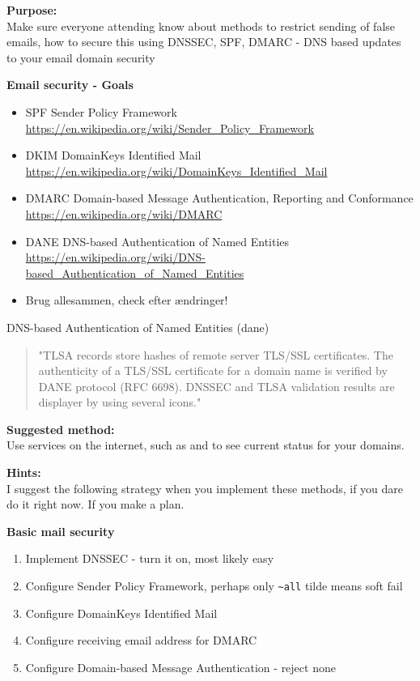 \documentclass[a4paper,11pt,notitlepage]{report}
\begin{document}
{\bf Purpose:}\\
Make sure everyone attending know about methods to restrict sending of false emails, how to secure this using DNSSEC, SPF, DMARC - DNS based updates to your email domain security


{\bf Email security - Goals}

\begin{itemize}
\item SPF Sender Policy Framework\\ {\footnotesize\url{https://en.wikipedia.org/wiki/Sender_Policy_Framework}}
\item DKIM DomainKeys Identified Mail\\
{\footnotesize\url{https://en.wikipedia.org/wiki/DomainKeys_Identified_Mail}}
\item DMARC Domain-based Message Authentication, Reporting and Conformance\\
{\footnotesize\url{https://en.wikipedia.org/wiki/DMARC}}
\item DANE DNS-based Authentication of Named Entities\\ {\footnotesize\url{https://en.wikipedia.org/wiki/DNS-based_Authentication_of_Named_Entities}}
\item Brug allesammen, check efter ændringer!
\end{itemize}

DNS-based Authentication of Named Entities (dane)
\begin{quote}\footnotesize
"TLSA records store hashes of remote server TLS/SSL certificates. The authenticity of a TLS/SSL certificate for a domain name is verified by DANE protocol (RFC 6698). DNSSEC and TLSA validation results are displayer by using several icons."
\end{quote}


{\bf Suggested method:}\\
Use services on the internet, such as  and  to see current status for your domains.

{\bf Hints:}\\
I suggest the following strategy when you implement these methods, if you dare do it right now. If you make a plan.

{\bf Basic mail security}
\begin{enumerate}
\item Implement DNSSEC - turn it on, most likely easy
\item Configure Sender Policy Framework, perhaps only \verb+~all+ tilde means soft fail
\item Configure DomainKeys Identified Mail
\item Configure receiving email address for DMARC
\item Configure Domain-based Message Authentication - reject none
\end{enumerate}
\end{document}

